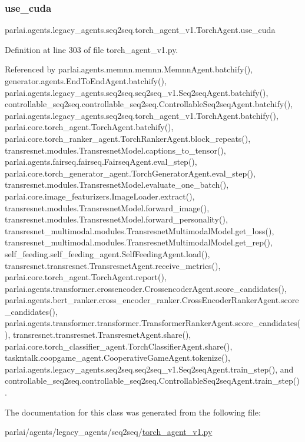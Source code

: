 \subsubsection{\texorpdfstring{use\+\_\+cuda}{use\_cuda}}
{\footnotesize\ttfamily parlai.\+agents.\+legacy\+\_\+agents.\+seq2seq.\+torch\+\_\+agent\+\_\+v1.\+Torch\+Agent.\+use\+\_\+cuda}



Definition at line 303 of file torch\+\_\+agent\+\_\+v1.\+py.



Referenced by parlai.\+agents.\+memnn.\+memnn.\+Memnn\+Agent.\+batchify(), generator.\+agents.\+End\+To\+End\+Agent.\+batchify(), parlai.\+agents.\+legacy\+\_\+agents.\+seq2seq.\+seq2seq\+\_\+v1.\+Seq2seq\+Agent.\+batchify(), controllable\+\_\+seq2seq.\+controllable\+\_\+seq2seq.\+Controllable\+Seq2seq\+Agent.\+batchify(), parlai.\+agents.\+legacy\+\_\+agents.\+seq2seq.\+torch\+\_\+agent\+\_\+v1.\+Torch\+Agent.\+batchify(), parlai.\+core.\+torch\+\_\+agent.\+Torch\+Agent.\+batchify(), parlai.\+core.\+torch\+\_\+ranker\+\_\+agent.\+Torch\+Ranker\+Agent.\+block\+\_\+repeats(), transresnet.\+modules.\+Transresnet\+Model.\+captions\+\_\+to\+\_\+tensor(), parlai.\+agents.\+fairseq.\+fairseq.\+Fairseq\+Agent.\+eval\+\_\+step(), parlai.\+core.\+torch\+\_\+generator\+\_\+agent.\+Torch\+Generator\+Agent.\+eval\+\_\+step(), transresnet.\+modules.\+Transresnet\+Model.\+evaluate\+\_\+one\+\_\+batch(), parlai.\+core.\+image\+\_\+featurizers.\+Image\+Loader.\+extract(), transresnet.\+modules.\+Transresnet\+Model.\+forward\+\_\+image(), transresnet.\+modules.\+Transresnet\+Model.\+forward\+\_\+personality(), transresnet\+\_\+multimodal.\+modules.\+Transresnet\+Multimodal\+Model.\+get\+\_\+loss(), transresnet\+\_\+multimodal.\+modules.\+Transresnet\+Multimodal\+Model.\+get\+\_\+rep(), self\+\_\+feeding.\+self\+\_\+feeding\+\_\+agent.\+Self\+Feeding\+Agent.\+load(), transresnet.\+transresnet.\+Transresnet\+Agent.\+receive\+\_\+metrics(), parlai.\+core.\+torch\+\_\+agent.\+Torch\+Agent.\+report(), parlai.\+agents.\+transformer.\+crossencoder.\+Crossencoder\+Agent.\+score\+\_\+candidates(), parlai.\+agents.\+bert\+\_\+ranker.\+cross\+\_\+encoder\+\_\+ranker.\+Cross\+Encoder\+Ranker\+Agent.\+score\+\_\+candidates(), parlai.\+agents.\+transformer.\+transformer.\+Transformer\+Ranker\+Agent.\+score\+\_\+candidates(), transresnet.\+transresnet.\+Transresnet\+Agent.\+share(), parlai.\+core.\+torch\+\_\+classifier\+\_\+agent.\+Torch\+Classifier\+Agent.\+share(), taskntalk.\+coopgame\+\_\+agent.\+Cooperative\+Game\+Agent.\+tokenize(), parlai.\+agents.\+legacy\+\_\+agents.\+seq2seq.\+seq2seq\+\_\+v1.\+Seq2seq\+Agent.\+train\+\_\+step(), and controllable\+\_\+seq2seq.\+controllable\+\_\+seq2seq.\+Controllable\+Seq2seq\+Agent.\+train\+\_\+step().



The documentation for this class was generated from the following file\+:\begin{DoxyCompactItemize}
\item 
parlai/agents/legacy\+\_\+agents/seq2seq/\hyperlink{torch__agent__v1_8py}{torch\+\_\+agent\+\_\+v1.\+py}\end{DoxyCompactItemize}
